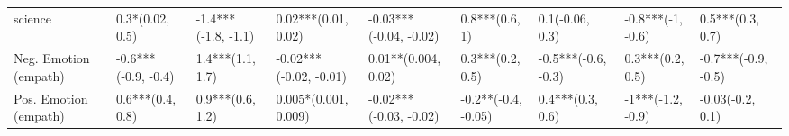 \begin{tabular}{lllllllll}
science               &      0.3*(0.02, 0.5) &  -1.4***(-1.8, -1.1) &      0.02***(0.01, 0.02) &  -0.03***(-0.04, -0.02) &       0.8***(0.6, 1) &      0.1(-0.06, 0.3) &    -0.8***(-1, -0.6) &     0.5***(0.3, 0.7) \\
Neg. Emotion (empath) &  -0.6***(-0.9, -0.4) &     1.4***(1.1, 1.7) &   -0.02***(-0.02, -0.01) &     0.01**(0.004, 0.02) &     0.3***(0.2, 0.5) &  -0.5***(-0.6, -0.3) &     0.3***(0.2, 0.5) &  -0.7***(-0.9, -0.5) \\
Pos. Emotion (empath) &     0.6***(0.4, 0.8) &     0.9***(0.6, 1.2) &     0.005*(0.001, 0.009) &  -0.02***(-0.03, -0.02) &  -0.2**(-0.4, -0.05) &     0.4***(0.3, 0.6) &    -1***(-1.2, -0.9) &     -0.03(-0.2, 0.1) \\
\bottomrule
\end{tabular}
